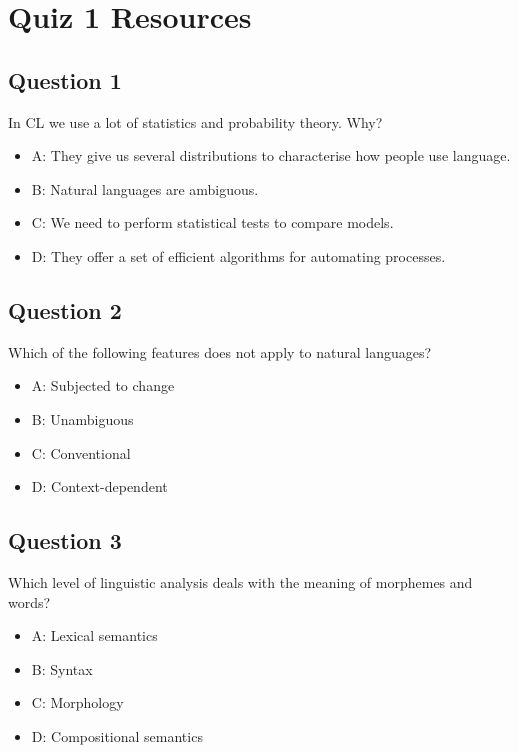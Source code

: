 \documentclass[
  11pt,
  british,
]{article}
\providecommand{\tightlist}{%
  \setlength{\itemsep}{0pt}\setlength{\parskip}{0pt}}
\begin{document}
\hypertarget{quiz-1-resources}{%
\section{Quiz 1 Resources}\label{quiz-1-resources}}

\hypertarget{question-1}{%
\subsection{Question 1}\label{question-1}}

In CL we use a lot of statistics and probability theory. Why?

\begin{itemize}
\tightlist
\item
  A: They give us several distributions to characterise how people use
  language.
\item
  B: Natural languages are ambiguous.
\item
  C: We need to perform statistical tests to compare models.
\item
  D: They offer a set of efficient algorithms for automating processes.
\end{itemize}

\hypertarget{question-2}{%
\subsection{Question 2}\label{question-2}}

Which of the following features does not apply to natural languages?

\begin{itemize}
\tightlist
\item
  A: Subjected to change
\item
  B: Unambiguous
\item
  C: Conventional
\item
  D: Context-dependent
\end{itemize}

\hypertarget{question-3}{%
\subsection{Question 3}\label{question-3}}

Which level of linguistic analysis deals with the meaning of morphemes
and words?

\begin{itemize}
\tightlist
\item
  A: Lexical semantics
\item
  B: Syntax
\item
  C: Morphology
\item
  D: Compositional semantics
\end{itemize}
\end{document}
